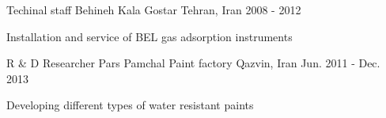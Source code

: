 \begin{cventries}
  \cventry
  {Techinal staff} %
  {Behineh Kala Gostar} %
  {Tehran, Iran} %
  {2008 - 2012} %
  {
    \begin{cvitems} %
    \item {Installation and service of BEL gas adsorption instruments}
    \end{cvitems}
  }

  \cventry
  {R \& D Researcher} %
  {Pars Pamchal Paint factory} %
  {Qazvin, Iran} %
  {Jun. 2011 - Dec. 2013} %
  {
    \begin{cvitems} %
    \item {Developing different types of water resistant paints}
    \end{cvitems}
  }


\end{cventries}
